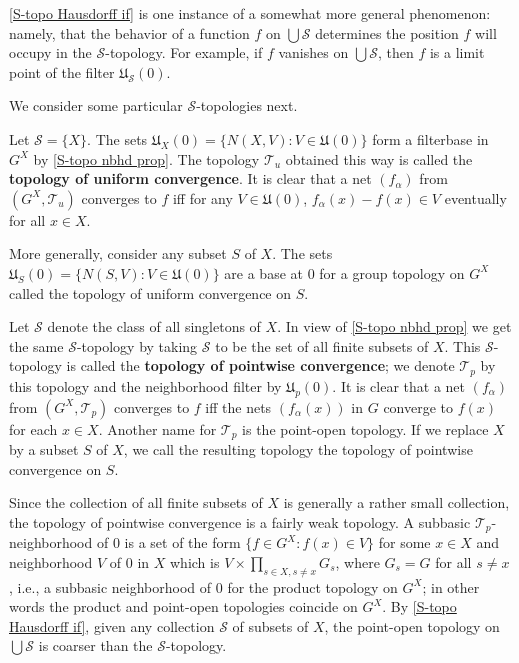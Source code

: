 \cref{S-topo Hausdorff if} is one instance of a somewhat more general phenomenon: namely, that the behavior of a function $f$ on $\bigcup\mathcal{S}$ determines the position $f$ will occupy in the $\mathcal{S}$-topology. For example, if $f$ vanishes on $\bigcup\mathcal{S}$, then $f$ is a limit point of the filter $\mathfrak{U}_{\mathcal{S}}(0)$.\par
We consider some particular $\mathcal{S}$-topologies next.
\begin{example}
Let $\mathcal{S}=\{X\}$. The sets $\mathfrak{U}_X(0)=\{N(X,V):V\in\mathfrak{U}(0)\}$ form a filterbase in $G^X$ by \cref{S-topo nbhd prop}. The topology $\mathcal{T}_u$ obtained this way is called the \textbf{topology of uniform convergence}. It is clear that a net $(f_\alpha)$ from $(G^X,\mathcal{T}_u)$ converges to $f$ iff for any $V\in\mathfrak{U}(0)$, $f_\alpha(x)-f(x)\in V$ eventually for all $x\in X$.\par
More generally, consider any subset $S$ of $X$. The sets $\mathfrak{U}_S(0)=\{N(S,V):V\in\mathfrak{U}(0)\}$ are a base at $0$ for a group topology on $G^X$ called the topology of uniform convergence on $S$.
\end{example}
\begin{example}
Let $\mathcal{S}$ denote the class of all singletons of $X$. In view of \cref{S-topo nbhd prop} we get the same $\mathcal{S}$-topology by taking $\mathcal{S}$ to be the set of all finite subsets of $X$. This $\mathcal{S}$-topology is called the \textbf{topology of pointwise convergence}; we denote $\mathcal{T}_p$ by this topology and the neighborhood filter by $\mathfrak{U}_p(0)$. It is clear that a net $(f_\alpha)$ from $(G^X,\mathcal{T}_p)$ converges to $f$ iff the nets $(f_\alpha(x))$ in $G$ converge to $f(x)$ for each $x\in X$. Another name for $\mathcal{T}_p$ is the point-open topology. If we replace $X$ by a subset $S$ of $X$, we call the resulting topology the topology of pointwise convergence on $S$.\par
Since the collection of all finite subsets of $X$ is generally a rather small collection, the topology of pointwise convergence is a fairly weak topology. A subbasic $\mathcal{T}_p$-neighborhood of $0$ is a set of the form $\{f\in G^X:f(x)\in V\}$ for some $x\in X$ and neighborhood $V$ of $0$ in $X$ which is $V\times\prod_{s\in X,s\neq x}G_s$, where $G_s=G$ for all $s\neq x$, i.e., a subbasic neighborhood of $0$ for the product topology on $G^X$; in other words the product and point-open topologies coincide on $G^X$. By \cref{S-topo Hausdorff if}, given any collection $\mathcal{S}$ of subsets of $X$, the point-open topology on $\bigcup\mathcal{S}$ is coarser than the $\mathcal{S}$-topology.
\end{example}
